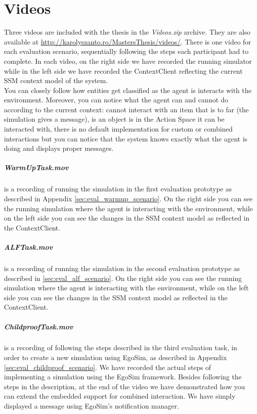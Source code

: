 \chapter{Videos}\label{ch:videos}
Three videos are included with the thesis in the \emph{Videos.zip} archive. They are also available at \url{http://karolyszanto.ro/MastersThesis/videos/}. There is one video for each evaluation scenario, sequentially following the steps each participant had to complete. In each video, on the right side we have recorded the running simulator while in the left side we have recorded the ContextClient reflecting the current SSM context model of the system.\\

You can closely follow how entities get classified as the agent is interacts with the environment. Moreover, you can notice what the agent can and cannot do according to the current context: cannot interact with an item that is to far (the simulation gives a message), is an object is in the Action Space it can be interacted with, there is no default implementation for custom or combined interactions but you can notice that the system knows exactly what the agent is doing and displays proper messages.\\

\paragraph{WarmUpTask.mov} is a recording of running the simulation in the first evaluation prototype as described in Appendix \ref{sec:eval_warmup_scenario}. On the right side you can see the running simulation where the agent is interacting with the environment, while on the left side you can see the changes in the SSM context model as reflected in the ContextClient.

\paragraph{ALFTask.mov} is a recording of running the simulation in the second evaluation prototype as described in \ref{sec:eval_alf_scenario}. On the right side you can see the running simulation where the agent is interacting with the environment, while on the left side you can see the changes in the SSM context model as reflected in the ContextClient.

\paragraph{ChildproofTask.mov} is a recording of following the steps described in the third evaluation task, in order to create a new simulation using EgoSim, as described in Appendix \ref{sec:eval_childproof_scenario}. We have recorded the actual steps of implementing a simulation using the EgoSim framework. Besides following the steps in the description, at the end of the video we have demonstrated how you can extend the embedded support for combined interaction. We have simply displayed a message using EgoSim's notification manager.